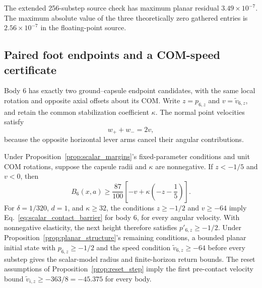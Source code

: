 The extended 256-substep source check has maximum planar residual $3.49\times10^{-7}$.
The maximum absolute value of the three theoretically zero gathered entries is $2.56\times10^{-7}$ in the floating-point source.

\subsection{Paired foot endpoints and a COM-speed certificate}
\label{app:paired_foot}

Body $6$ has exactly two ground--capsule endpoint candidates, with the same local rotation and opposite axial offsets about its COM.
Write $z=p_{6,z}$ and $v=\widetilde v_{6,z}$, and retain the common stabilization coefficient $\kappa$.
The normal point velocities satisfy
\begin{equation}
 w_++w_-=2v,
 \label{eq:foot_pair_velocity}
\end{equation}
because the opposite horizontal lever arms cancel their angular contributions.

\begin{proposition}
\label{prop:paired_foot}
Under Proposition~\ref{prop:scalar_margins}'s fixed-parameter conditions and unit COM rotations, suppose the capsule radii and $\kappa$ are nonnegative.
If $z<-1/5$ and $v<0$, then
\begin{equation}
 B_6(x,a)\ge\frac{87}{100}
       \left[-v+\kappa\left(-z-\frac15\right)\right].
 \label{eq:foot_pair_recovery}
\end{equation}
For $\delta=1/320$, $d=1$, and $\kappa\ge32$, the conditions $z\ge-1/2$ and $v\ge-64$ imply Eq.~\eqref{eq:scalar_contact_barrier} for body $6$, for every angular velocity.
With nonnegative elasticity, the next height therefore satisfies $p'_{6,z}\ge-1/2$.
Under Proposition~\ref{prop:planar_structure}'s remaining conditions, a bounded planar initial state with $p_{6,z}\ge-1/2$ and the speed condition $\widetilde v_{6,z}\ge-64$ before every substep gives the scalar-model radius and finite-horizon return bounds.
The reset assumptions of Proposition~\ref{prop:reset_step} imply the first pre-contact velocity bound $\widetilde v_{i,z}\ge-363/8=-45.375$ for every body.
\end{proposition}

